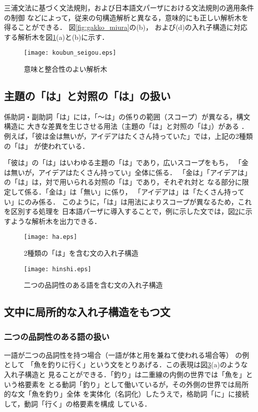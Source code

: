 \documentclass[japanese]{jnlp_1.2}
\begin{document}
三浦文法に基づく文法規則，および日本語文パーザにおける文法規則の適用条件の制御
などによって，従来の句構造解析と異なる，意味的にも正しい解析木を得ることができる．
図\ref{fig:gakko_miura}の(b)，
および(d)の入れ子構造に対応する解析木を図\ref{fig:koubun_seigou}(a)と(b)に示す．

\begin{figure}[t]
  \centering
      \texttt{[image: koubun\_seigou.eps]}
  \caption{意味と整合性のよい解析木} \label{fig:koubun_seigou}
\end{figure}

\subsection{主題の「は」と対照の「は」の扱い}
係助詞・副助詞「は」には，「〜は」の係りの範囲（スコープ）が異なる，構文構造に
大きな差異を生じさせる用法（主題の「は」と対照の「は」）がある
\cite{沼崎他1995}
．
例えば，「彼は金は無いが，アイデアはたくさん持っていた」では，上記の2種類の「は」
が使われている．

「彼は」の「は」はいわゆる主題の「は」であり，広いスコープをもち，
「金は無いが，アイデアはたくさん持ってい」全体に係る．
「金は」「アイデアは」の「は」は，対で用いられる対照の「は」であり，それぞれ対と
なる部分に限定して係る．「金は」は「無い」に係り，
「アイデアは」は「たくさん持ってい」にのみ係る．
このように，「は」は用法によりスコープが異なるため，これを区別する処理を
日本語パーザに導入することで，例に示した文では，図\ref{fig:ha}に示すような解析木を出力できる．

\begin{figure}[b]
  \centering
      \texttt{[image: ha.eps]}
  \caption{2種類の「は」を含む文の入れ子構造} \label{fig:ha}
\end{figure}

\begin{figure}[t]
  \centering
      \texttt{[image: hinshi.eps]}
  \caption{二つの品詞性のある語を含む文の入れ子構造} \label{fig:hinshi}
\end{figure}


\subsection{文中に局所的な入れ子構造をもつ文}

    \subsubsection{二つの品詞性のある語の扱い}
一語が二つの品詞性を持つ場合（一語が体と用を兼ねて使われる場合等）\pagebreak
の例として
「魚を釣りに行く」という文をとりあげる．この表現は図\ref{fig:hinshi}(a)のような入れ子構造と
見ることができる．「釣り」は二重線の内側の世界では「魚を」という格要素を
とる動詞「釣り」として働いているが，その外側の世界では局所的な文「魚を釣り」全体
を実体化（名詞化）したうえで，格助詞「に」に接続して，動詞「行く」の格要素を構成
している．
\end{document}
